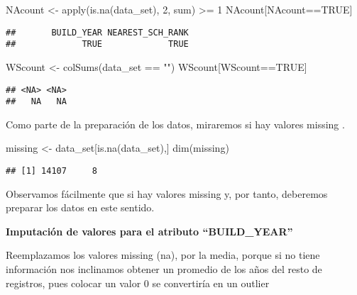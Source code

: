 \documentclass[
]{article}
\newenvironment{Shaded}{\begin{snugshade}}{\end{snugshade}}
\newcommand{\ConstantTok}[1]{\textcolor[rgb]{0.00,0.00,0.00}{#1}}
\newcommand{\DecValTok}[1]{\textcolor[rgb]{0.00,0.00,0.81}{#1}}
\newcommand{\FunctionTok}[1]{\textcolor[rgb]{0.00,0.00,0.00}{#1}}
\newcommand{\NormalTok}[1]{#1}
\newcommand{\OtherTok}[1]{\textcolor[rgb]{0.56,0.35,0.01}{#1}}
\newcommand{\SpecialCharTok}[1]{\textcolor[rgb]{0.00,0.00,0.00}{#1}}
\newcommand{\StringTok}[1]{\textcolor[rgb]{0.31,0.60,0.02}{#1}}
\begin{document}
\begin{Shaded}
\begin{Highlighting}[]
\NormalTok{NAcount }\OtherTok{\textless{}{-}} \FunctionTok{apply}\NormalTok{(}\FunctionTok{is.na}\NormalTok{(data\_set), }\DecValTok{2}\NormalTok{, sum) }\SpecialCharTok{\textgreater{}=} \DecValTok{1}
\NormalTok{NAcount[NAcount}\SpecialCharTok{==}\ConstantTok{TRUE}\NormalTok{]}
\end{Highlighting}
\end{Shaded}

\begin{verbatim}
##       BUILD_YEAR NEAREST_SCH_RANK 
##             TRUE             TRUE
\end{verbatim}

\begin{Shaded}
\begin{Highlighting}[]
\NormalTok{WScount }\OtherTok{\textless{}{-}} \FunctionTok{colSums}\NormalTok{(data\_set }\SpecialCharTok{==} \StringTok{""}\NormalTok{)}
\NormalTok{WScount[WScount}\SpecialCharTok{==}\ConstantTok{TRUE}\NormalTok{]}
\end{Highlighting}
\end{Shaded}

\begin{verbatim}
## <NA> <NA> 
##   NA   NA
\end{verbatim}

Como parte de la preparación de los datos, miraremos si hay valores
missing .

\begin{Shaded}
\begin{Highlighting}[]
\NormalTok{missing }\OtherTok{\textless{}{-}}\NormalTok{ data\_set[}\FunctionTok{is.na}\NormalTok{(data\_set),]}
\FunctionTok{dim}\NormalTok{(missing)}
\end{Highlighting}
\end{Shaded}

\begin{verbatim}
## [1] 14107     8
\end{verbatim}

Observamos fácilmente que si hay valores missing y, por tanto, deberemos
preparar los datos en este sentido.

\textbf{Imputación de valores para el atributo ``BUILD\_YEAR''}

Reemplazamos los valores missing (na), por la media, porque si no tiene
información nos inclinamos obtener un promedio de los años del resto de
registros, pues colocar un valor 0 se convertiría en un outlier
\end{document}
